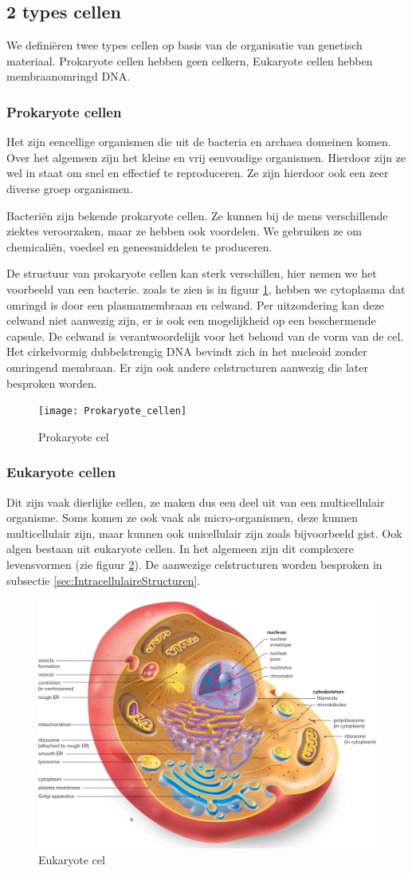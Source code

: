 \documentclass[a4paper,kul]{kulakarticle} %
\begin{document}
\subsection{2 types cellen}
We definiëren twee types cellen op basis van de organisatie van genetisch materiaal. Prokaryote cellen hebben geen celkern, Eukaryote cellen hebben membraanomringd DNA.  
\subsubsection{Prokaryote cellen}
Het zijn eencellige organismen die uit de bacteria en archaea domeinen komen. Over het algemeen zijn het kleine en vrij eenvoudige organismen. Hierdoor zijn ze wel in staat om snel en effectief te reproduceren. Ze zijn hierdoor ook een zeer diverse groep organismen. 

Bacteriën zijn bekende prokaryote cellen. Ze kunnen bij de mens verschillende ziektes veroorzaken, maar ze hebben ook voordelen. We gebruiken ze om chemicaliën, voedsel en geneesmiddelen te produceren. 

De structuur van prokaryote cellen kan sterk verschillen, hier nemen we het voorbeeld van een bacterie. zoals te zien is in figuur \ref{fig:prokaryotecellen}, hebben we cytoplasma dat omringd is door een plasmamembraan en celwand. Per uitzondering kan deze celwand niet aanwezig zijn, er is ook een mogelijkheid op een beschermende capsule. De celwand is verantwoordelijk voor het behoud van de vorm van de cel.  Het cirkelvormig dubbelstrengig DNA bevindt zich in het nucleoid zonder omringend membraan. Er zijn ook andere celstructuren aanwezig die later besproken worden. 

\begin{figure}[h]
	\centering
	\texttt{[image: Prokaryote\_cellen]}
	\caption[Prokaryote cel]{Prokaryote cel}
	\label{fig:prokaryotecellen}
\end{figure}
\newpage
\subsubsection{Eukaryote cellen}
Dit zijn vaak dierlijke cellen, ze maken dus een deel uit van een multicellulair organisme. Soms komen ze ook vaak als micro-organismen, deze kunnen multicellulair zijn, maar kunnen ook unicellulair zijn zoals bijvoorbeeld gist. Ook algen bestaan uit eukaryote cellen. In het algemeen zijn dit complexere levensvormen (zie figuur \ref{fig:eukaryotecel}). De aanwezige celstructuren worden besproken in subsectie \ref{sec:IntracellulaireStructuren}. 
\begin{figure}[h]
	\centering
	\includegraphics[width=0.5\linewidth]{Eukaryote_cel}
	\caption[Eukaryote cel]{Eukaryote cel}
	\label{fig:eukaryotecel}
\end{figure}
\end{document}
